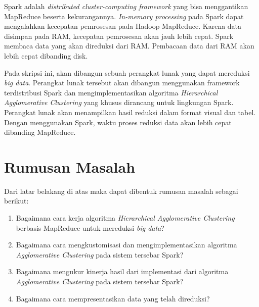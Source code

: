 Spark adalah {\it distributed cluster-computing framework} yang bisa menggantikan MapReduce beserta kekurangannya. {\it In-memory processing} pada Spark dapat mengalahkan kecepatan pemrosesan pada Hadoop MapReduce. Karena data disimpan pada RAM, kecepatan pemrosesan akan jauh lebih cepat. Spark membaca data yang akan direduksi dari RAM. Pembacaan data dari RAM akan lebih cepat dibanding disk.

Pada skripsi ini, akan dibangun sebuah perangkat lunak yang dapat mereduksi {\it big data}. Perangkat lunak tersebut akan dibangun menggunakan framework terdistribusi Spark dan mengimplementasikan algoritma {\it Hierarchical Agglomerative Clustering} yang khusus dirancang untuk lingkungan Spark. Perangkat lunak akan menampilkan hasil reduksi dalam format visual dan tabel. Dengan menggunakan Spark, waktu proses reduksi data akan lebih cepat dibanding MapReduce.




\section{Rumusan Masalah}
\label{sec:rumusan}
Dari latar belakang di atas maka dapat dibentuk rumusan masalah sebagai berikut:
\begin{enumerate}

\item Bagaimana cara kerja algoritma {\it Hierarchical Agglomerative Clustering} berbasis MapReduce untuk mereduksi {\it big data}?

\item Bagaimana cara mengkustomisasi dan mengimplementasikan algoritma {\it Agglomerative Clustering} pada sistem tersebar Spark?

\item Bagaimana mengukur kinerja hasil dari implementasi dari algoritma {\it Agglomerative Clustering} pada sistem tersebar Spark?

\item Bagaimana cara mempresentasikan data yang telah direduksi?

\end{enumerate}



